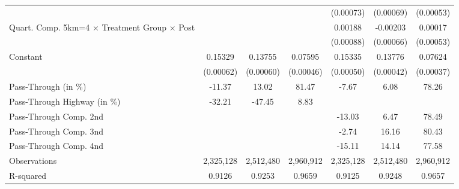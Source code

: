 {\begin{tabular}{l*{6}{c}}
                    &                     &                     &                     &   (0.00073)         &   (0.00069)         &   (0.00053)         \\
Quart. Comp. 5km=4 $\times$ Treatment Group $\times$ Post&                     &                     &                     &     0.00188\sym{**} &    -0.00203\sym{***}&     0.00017         \\
                    &                     &                     &                     &   (0.00088)         &   (0.00066)         &   (0.00053)         \\
Constant            &     0.15329\sym{***}&     0.13755\sym{***}&     0.07595\sym{***}&     0.15335\sym{***}&     0.13776\sym{***}&     0.07624\sym{***}\\
                    &   (0.00062)         &   (0.00060)         &   (0.00046)         &   (0.00050)         &   (0.00042)         &   (0.00037)         \\
\midrule
Pass-Through (in \%)&      -11.37         &       13.02         &       81.47         &       -7.67         &        6.08         &       78.26         \\
Pass-Through Highway (in \%)&      -32.21         &      -47.45         &        8.83         &                     &                     &                     \\
Pass-Through Comp. 2nd&                     &                     &                     &      -13.03         &        6.47         &       78.49         \\
Pass-Through Comp. 3nd&                     &                     &                     &       -2.74         &       16.16         &       80.43         \\
Pass-Through Comp. 4nd&                     &                     &                     &      -15.11         &       14.14         &       77.58         \\
Observations        &   2,325,128         &   2,512,480         &   2,960,912         &   2,325,128         &   2,512,480         &   2,960,912         \\
R-squared           &      0.9126         &      0.9253         &      0.9659         &      0.9125         &      0.9248         &      0.9657         \\
\bottomrule
\end{tabular}
}
